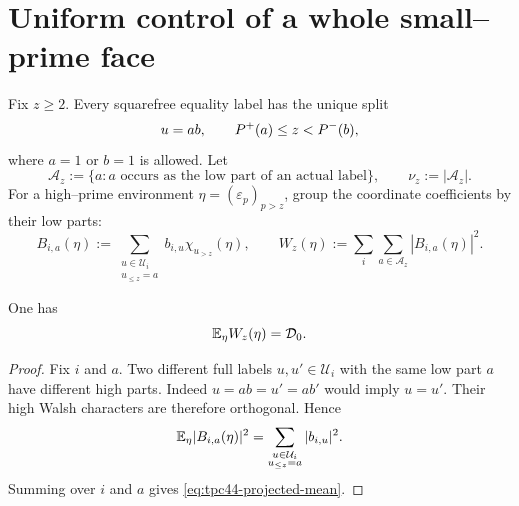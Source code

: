 \section{Uniform control of a whole small--prime face}
\label{sec:tpc44-robust-face}

Fix \(z\ge2\).  Every squarefree equality label has the unique split
\begin{equation}
 u=a b,
 \qquad
 P^{+}(a)\le z<P^{-}(b),
 \label{eq:tpc44-label-low-high}
\end{equation}
where \(a=1\) or \(b=1\) is allowed.  Let
\begin{equation}
 \mathcal A_z:=\{a:a\text{ occurs as the low part of an actual label}\},
 \qquad \nu_z:=|\mathcal A_z|.
 \label{eq:tpc44-low-projection-set}
\end{equation}
For a high--prime environment \(\eta=(\varepsilon_p)_{p>z}\), group
the coordinate coefficients by their low parts:
\begin{equation}
 B_{i,a}(\eta)
 :=\sum_{\substack{u\in\mathcal U_i\\u_{\le z}=a}}
 b_{i,u}\chi_{u_{>z}}(\eta),
 \qquad
 W_z(\eta):=\sum_i\sum_{a\in\mathcal A_z}|B_{i,a}(\eta)|^2.
 \label{eq:tpc44-B-W}
\end{equation}

\begin{lemma}
\label{lem:tpc44-projected-diagonal}
One has
\begin{equation}
 \mathbb E_{\eta}W_z(\eta)=\mathcal D_0.
 \label{eq:tpc44-projected-mean}
\end{equation}
\end{lemma}

\begin{proof}
Fix \(i\) and \(a\).  Two different full labels \(u,u'\in\mathcal U_i\)
with the same low part \(a\) have different high parts.  Indeed
\(u=ab=u'=ab'\) would imply \(u=u'\).  Their high Walsh characters are
therefore orthogonal.  Hence
\begin{equation}
 \mathbb E_\eta|B_{i,a}(\eta)|^2
 =\sum_{\substack{u\in\mathcal U_i\\u_{\le z}=a}}|b_{i,u}|^2.
 \label{eq:tpc44-B-diagonal}
\end{equation}
Summing over \(i\) and \(a\) gives \eqref{eq:tpc44-projected-mean}.
\end{proof}

